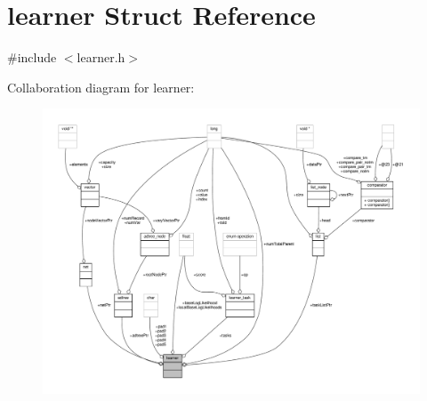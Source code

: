 \hypertarget{structlearner}{\section{learner Struct Reference}
\label{structlearner}
}


{\ttfamily \#include $<$learner.\-h$>$}



Collaboration diagram for learner\-:
\nopagebreak
\begin{figure}[H]
\begin{center}
\leavevmode
\includegraphics[width=350pt]{structlearner__coll__graph}
\end{center}
\end{figure}
